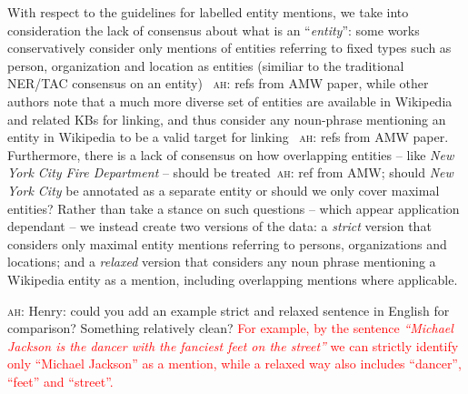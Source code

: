 \documentclass{llncs}
\newcommand{\ah}[1]{{\color{blue}\textsc{ah:} #1}}
\begin{document}
With respect to the guidelines for labelled entity mentions, we take into consideration the lack of consensus about what is an ``\textit{entity}'': some works conservatively consider only mentions of entities referring to fixed types such as person, organization and location as entities (similiar to the traditional NER/TAC consensus on an entity)\textcolor{red}{~\cite{ourAMW2018}} \ah{refs from AMW paper}, while other authors note that a much more diverse set of entities are available in Wikipedia and related KBs for linking, and thus consider any noun-phrase mentioning an entity in Wikipedia to be a valid target for linking\textcolor{red}{~\cite{ourAMW2018}} \ah{refs from AMW paper}. Furthermore, there is a lack of consensus on how overlapping entities -- like \textit{New York City Fire Department} -- should be treated\textcolor{red}{~\cite{ourAMW2018}}\ah{ref from AMW}; should \textit{New York City} be annotated as a separate entity or should we only cover maximal entities? Rather than take a stance on such questions -- which appear application dependant -- we instead create two versions of the data: a \textit{strict} version that considers only maximal entity mentions referring to persons, organizations and locations; and a \textit{relaxed} version that considers any noun phrase mentioning a Wikipedia entity as a mention, including overlapping mentions where applicable.

\ah{Henry: could you add an example strict and relaxed sentence in English for comparison? Something relatively clean?}
\textcolor{red}{For example, by the sentence \textit{``Michael Jackson is the dancer with the fanciest feet on the street''} we can strictly identify only ``Michael Jackson'' as a mention, while a relaxed way also includes ``dancer'', ``feet'' and ``street''.}

\end{document}
